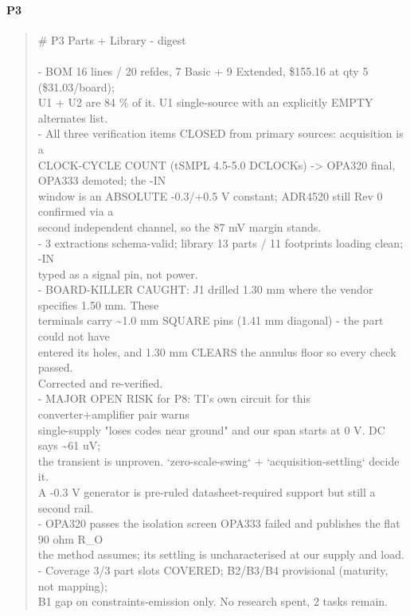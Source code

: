 \documentclass[11pt,a4paper]{article}
\begin{document}
\paragraph*{P3}
\begin{quote}\small\ttfamily\raggedright
\# P3 Parts + Library - digest\\
~\\
- BOM 16 lines / 20 refdes, 7 Basic + 9 Extended, \$155.16 at qty 5 (\$31.03/board);\\
  U1 + U2 are 84 \% of it. U1 single-source with an explicitly EMPTY alternates list.\\
- All three verification items CLOSED from primary sources: acquisition is a\\
  CLOCK-CYCLE COUNT (tSMPL 4.5-5.0 DCLOCKs) -\textgreater{} OPA320 final, OPA333 demoted; the -IN\\
  window is an ABSOLUTE -0.3/+0.5 V constant; ADR4520 still Rev 0 confirmed via a\\
  second independent channel, so the 87 mV margin stands.\\
- 3 extractions schema-valid; library 13 parts / 11 footprints loading clean; -IN\\
  typed as a signal pin, not power.\\
- BOARD-KILLER CAUGHT: J1 drilled 1.30 mm where the vendor specifies 1.50 mm. These\\
  terminals carry \textasciitilde{}1.0 mm SQUARE pins (1.41 mm diagonal) - the part could not have\\
  entered its holes, and 1.30 mm CLEARS the annulus floor so every check passed.\\
  Corrected and re-verified.\\
- MAJOR OPEN RISK for P8: TI's own circuit for this converter+amplifier pair warns\\
  single-supply "loses codes near ground" and our span starts at 0 V. DC says \textasciitilde{}61 uV;\\
  the transient is unproven. `zero-scale-swing` + `acquisition-settling` decide it.\\
  A -0.3 V generator is pre-ruled datasheet-required support but still a second rail.\\
- OPA320 passes the isolation screen OPA333 failed and publishes the flat 90 ohm R\_O\\
  the method assumes; its settling is uncharacterised at our supply and load.\\
- Coverage 3/3 part slots COVERED; B2/B3/B4 provisional (maturity, not mapping);\\
  B1 gap on constraints-emission only. No research spent, 2 tasks remain.
\end{quote}
\end{document}
